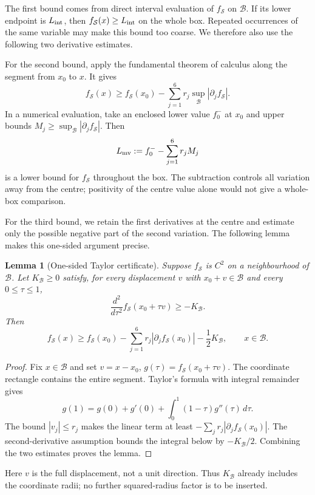 \documentclass[reqno,english]{amsart}
\newtheorem{lemma}[theorem]{Lemma}
\theoremstyle{definition}
\newtheorem{open problem}[theorem]{Open Problem}
\theoremstyle{remark}
\theoremstyle{plain}
\numberwithin{equation}{section}
\begin{document}
The first bound comes from direct interval evaluation of
$f_{\mathcal S}$ on $\mathcal B$. If its lower endpoint is
$L_{\rm int}$, then $f_{\mathcal S}(x)\ge L_{\rm int}$ on the
whole box. Repeated occurrences of the same variable may make this
bound too coarse. We therefore also use the following two derivative
estimates.


For the second bound, apply the fundamental theorem of calculus along
the segment from $x_0$ to $x$. It gives
\begin{equation}\label{T:eq:meanvalue}
 f_{\mathcal S}(x)\ge f_{\mathcal S}(x_0)
 -\sum_{j=1}^6r_j\sup_{\mathcal B}|\partial_jf_{\mathcal S}|.
\end{equation}
In a numerical evaluation, take an enclosed lower value $f_0^-$ at
$x_0$ and upper bounds $M_j\ge\sup_{\mathcal B}|\partial_jf_{\mathcal S}|$.
Then
\[
 L_{\rm mv}:=f_0^--\sum_{j=1}^6r_jM_j
\]
is a lower bound for $f_{\mathcal S}$ throughout the box. The subtraction controls all
variation away from the centre; positivity of the centre value alone
would not give a whole-box comparison.


For the third bound, we retain the first derivatives at the centre
and estimate only the possible negative part of the second variation.
The following lemma makes this one-sided argument precise.
\begin{lemma}[One-sided Taylor certificate]\label{T:lem:taylor}
Suppose $f_{\mathcal S}$ is $C^2$ on a neighbourhood of $\mathcal B$.
Let $K_{\mathcal B}\ge0$ satisfy, for every displacement $v$ with
$x_0+v\in\mathcal B$ and every $0\le\tau\le1$,
\begin{equation}\label{T:eq:secondonesided}
 \frac{d^2}{d\tau^2}f_{\mathcal S}(x_0+\tau v)
 \ge-K_{\mathcal B}.
\end{equation}
Then
\begin{equation}\label{T:eq:taylorbound}
 f_{\mathcal S}(x)\ge f_{\mathcal S}(x_0)
 -\sum_{j=1}^6r_j|\partial_jf_{\mathcal S}(x_0)|
 -\frac12K_{\mathcal B},\qquad x\in\mathcal B.
\end{equation}
\end{lemma}
\begin{proof}
Fix $x\in\mathcal B$ and set $v=x-x_0$,
$g(\tau)=f_{\mathcal S}(x_0+\tau v)$. The coordinate rectangle
contains the entire segment. Taylor's formula with integral remainder
gives
\[
 g(1)=g(0)+g'(0)+\int_0^1(1-\tau)g''(\tau)\,d\tau.
\]
The bound $|v_j|\le r_j$ makes the linear term at least
$-\sum_jr_j|\partial_jf_{\mathcal S}(x_0)|$.
The second-derivative assumption bounds the integral below by
$-K_{\mathcal B}/2$. Combining the two estimates proves the lemma.
\end{proof}
Here $v$ is the full displacement, not a unit direction. Thus
$K_{\mathcal B}$ already includes the coordinate radii; no further
squared-radius factor is to be inserted.
\end{document}
